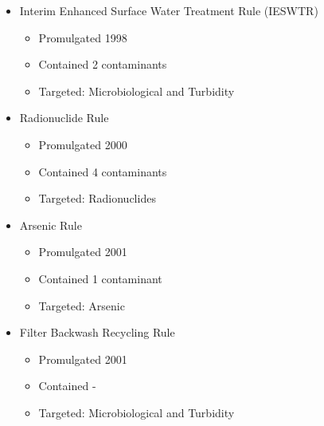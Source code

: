 \begin{itemize}
\begin{itemize}
\end{itemize}
\item Interim Enhanced Surface Water Treatment Rule (IESWTR)
\begin{itemize}
\item Promulgated 1998
\item Contained 2 contaminants
\item Targeted: Microbiological and Turbidity
\end{itemize}
\item Radionuclide Rule
\begin{itemize}
\item Promulgated 2000
\item Contained 4 contaminants
\item Targeted: Radionuclides
\end{itemize}
\item Arsenic Rule
\begin{itemize}
\item Promulgated 2001
\item Contained 1 contaminant
\item Targeted: Arsenic
\end{itemize}
\item Filter Backwash Recycling Rule
\begin{itemize}
\item Promulgated 2001
\item Contained -
\item Targeted: Microbiological and Turbidity
\end{itemize}
\end{itemize}

